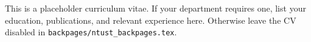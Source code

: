 
This is a placeholder curriculum vitae. If your department requires one, list
your education, publications, and relevant experience here. Otherwise leave the
CV disabled in \texttt{backpages/ntust\_backpages.tex}.
